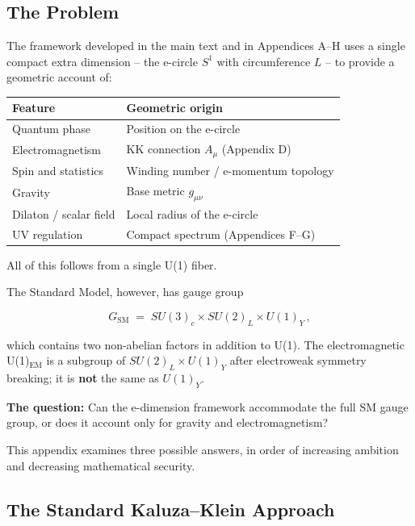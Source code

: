 \documentclass[aps,prd,preprint,superscriptaddress,longbibliography,floatfix]{revtex4-2}
\theoremstyle{remark}
\begin{document}
\subsection{The Problem}

The framework developed in the main text and in Appendices A--H uses a single compact extra dimension -- the e-circle $S^1$ with circumference $L$ -- to provide a geometric account of:


\begin{table}[H]
\begin{ruledtabular}
\begin{tabular}{p{7.5cm}p{7.5cm}}
Feature & Geometric origin \\
\hline
Quantum phase & Position on the e-circle \\
Electromagnetism & KK connection $A_\mu$ (Appendix D) \\
Spin and statistics & Winding number / e-momentum topology \\
Gravity & Base metric $g_{\mu\nu}$ \\
Dilaton / scalar field & Local radius of the e-circle \\
UV regulation & Compact spectrum (Appendices F--G) \\
\end{tabular}
\end{ruledtabular}
\end{table}

All of this follows from a single U(1) fiber.

The Standard Model, however, has gauge group


\begin{equation}
    G_{\text{SM}} \;=\; SU(3)_c \times SU(2)_L \times U(1)_Y \,,
\end{equation}

which contains two non-abelian factors in addition to U(1). The electromagnetic U(1)$_{\text{EM}}$ is a subgroup of $SU(2)_L \times U(1)_Y$ after electroweak symmetry breaking; it is \textbf{not} the same as $U(1)_Y$.

\textbf{The question:} Can the e-dimension framework accommodate the full SM gauge group, or does it account only for gravity and electromagnetism?

This appendix examines three possible answers, in order of increasing ambition and decreasing mathematical security.



\subsection{The Standard Kaluza--Klein Approach}
\end{document}
